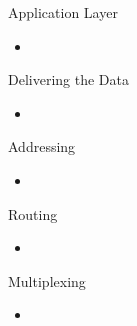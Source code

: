 \documentclass{beamer}
\begin{document}
\begin{frame}{Application Layer}

\begin{itemize}
\item
\end{itemize}

\end{frame}

\begin{frame}{Delivering the Data}

\begin{itemize}
\item
\end{itemize}

\end{frame}

\begin{frame}{Addressing}

\begin{itemize}
\item
\end{itemize}

\end{frame}

\begin{frame}{Routing}

\begin{itemize}
\item
\end{itemize}

\end{frame}

\begin{frame}{Multiplexing}

\begin{itemize}
\item
\end{itemize}

\end{frame}
\end{document}

